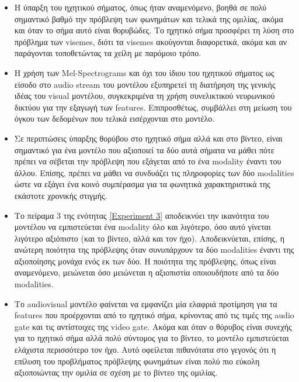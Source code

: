 \begin{itemize}
\item Η ύπαρξη του ηχητικού σήματος, όπως ήταν αναμενόμενο, βοηθά σε πολύ σημαντικό βαθμό την πρόβλεψη των φωνημάτων και τελικά της ομιλίας, ακόμα και όταν το σήμα αυτό είναι θορυβώδες. Το ηχητικό σήμα προσφέρει τη λύση στο πρόβλημα των visemes, διότι τα visemes ακούγονται διαφορετικά, ακόμα και αν παράγονται τοποθετώντας τα χείλη με παρόμοιο τρόπο.

\item Η χρήση των Mel-Spectrograms και όχι του ίδιου του ηχητικού σήματος ως είσοδο στο audio stream του μοντέλου εξυπηρετεί τη διατήρηση της γενικής ιδέας του visual μοντέλου, συγκεκριμένα τη χρήση συνελικτικού νευρωνικού δικτύου για την εξαγωγή των features. Επιπροσθέτως, συμβάλλει στη μείωση του όγκου των δεδομένων που τελικά εισέρχονται στο μοντέλο.

\item Σε περιπτώσεις ύπαρξης θορύβου στο ηχητικό σήμα αλλά και στο βίντεο, είναι σημαντικό για ένα μοντέλο που αξιοποιεί τα δύο αυτά σήματα να μάθει πότε πρέπει να σέβεται την πρόβλεψη που εξάγεται από το ένα modality έναντι του άλλου. Επίσης, πρέπει να μάθει να συνδυάζει τις πληροφορίες των δύο modalities ώστε να εξάγει ένα κοινό συμπέρασμα για τα φωνητικά χαρακτηριστικά της εκάστοτε χρονικής στιγμής.

\item Το πείραμα 3 της ενότητας \ref{Experiment 3} αποδεικνύει την ικανότητα του μοντέλου να εμπιστεύεται ένα modality όλο και λιγότερο, όσο αυτό γίνεται λιγότερο αξιόπιστο (και το βίντεο, αλλά και τον ήχο). Αποδεικνύεται, επίσης, η ανώτερη ποιότητα της πρόβλεψης όταν συνυπάρχουν τα δύο modalities έναντι της αξιοποίησης μονάχα ενός εκ των δύο. Η ποιότητα της πρόβλεψης, όπως είναι αναμενόμενο, μειώνεται όσο μειώνεται η αξιοπιστία οποιουδήποτε από τα δύο modalities.

\item Το audiovisual μοντέλο φαίνεται να εμφανίζει μία ελαφριά προτίμηση για τα features που προέρχονται από το ηχητικό σήμα, κρίνοντας από τις τιμές της audio gate και τις αντίστοιχες της video gate. Ακόμα και όταν ο θόρυβος είναι συνεχής για το ηχητικό σήμα αλλά πολύ σύντομος για το βίντεο, το μοντέλο εμπιστεύεται ελάχιστα περισσότερο τον ήχο. Αυτό οφείλεται πιθανότατα στο γεγονός ότι η επίλυση του προβλήματος πρόβλεψης φωνημάτων είναι πολύ πιο εύκολη αξιοποιώντας την ομιλία σε σχέση με το βίντεο της ομιλίας.
\end{itemize}

